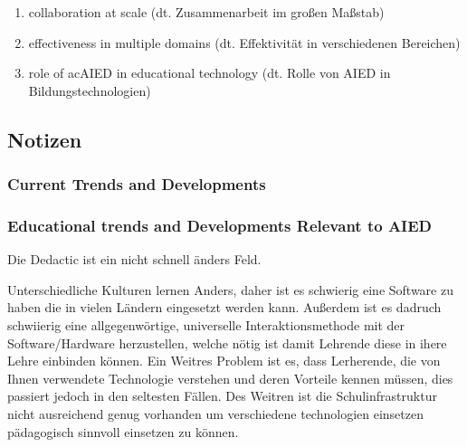 \begin{enumerate}
    \item collaboration at scale (dt. Zusammenarbeit im großen Maßstab) \\
    
    \item effectiveness in multiple domains (dt. Effektivität in verschiedenen Bereichen) \\
    
    \item role of ac{AIED} in educational technology (dt. Rolle von \ac{AIED} in Bildungstechnologien) \\
\end{enumerate} 


\begin{comment}
Die Gesellschaft für Informatiker hat Herausforderungen für den Bereich Informatik definiert. Diese gelten selbstverständlich auch für \ac{AIED} Systeme.
Bei den Herausforderungen handelt es sich um die Bewahrung und Archivierung des digitalen Kulturerbes, ermöglichung eines sicheren, privaten, freien und vertrauensvollen Nutzung des Internets,
Bewältigung von Risikin in Globalen IT Infrastrukturen, Entwicklung von Interaktionsmöglichkeiten, die es allen Menschen ermöglicht von IT Systemen zu profitieren, sowie die Gewährleitungs das IT Systeme dauerhaft verfügbar sind.
weitere 
\end{comment}
    
\subsection{Notizen}

\subsubsection*{Current Trends and Developments}

\subsubsection{Educational trends and Developments Relevant to AIED}
Die Dedactic ist ein nicht schnell änders Feld.

Unterschiedliche Kulturen lernen Anders, daher ist es schwierig eine Software zu haben die in vielen Ländern eingesetzt werden kann.
Außerdem ist es dadruch schwiierig eine allgegenwörtige, universelle Interaktionsmethode mit der Software/Hardware herzustellen,
welche nötig ist damit Lehrende diese in ihere Lehre einbinden können. 
Ein Weitres Problem ist es, dass Lerherende, die von Ihnen verwendete Technologie verstehen und deren Vorteile kennen müssen,
dies passiert jedoch in den seltesten Fällen. Des Weitren ist die Schulinfrastruktur nicht ausreichend genug vorhanden um verschiedene technologien einsetzen pädagogisch sinnvoll einsetzen zu können.


